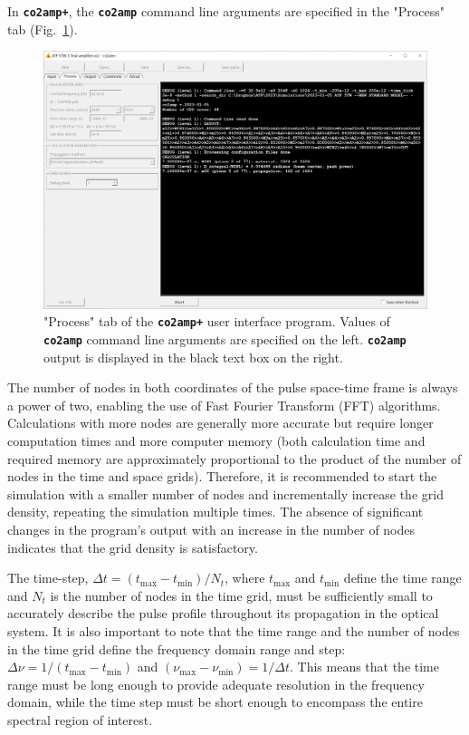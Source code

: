 In \textbf{\texttt{co2amp+}}, the \textbf{\texttt{co2amp}} command line arguments are specified in the "Process" tab (Fig.~\ref{fig:gui-process}).
\begin{figure}[ht]
 \centering
 \includegraphics[width=14cm]{images/gui-process}
 \caption{"Process" tab of the \textbf{\texttt{co2amp+}} user interface program. Values of \textbf{\texttt{co2amp}} command line arguments are specified on the left. \textbf{\texttt{co2amp}} output is displayed in the black text box on the right.}
 \label{fig:gui-process}
\end{figure}
The number of nodes in both coordinates of the pulse space-time frame is always a power of two, enabling the use of Fast Fourier Transform (FFT) algorithms. Calculations with more nodes are generally more accurate but require longer computation times and more computer memory (both calculation time and required memory are approximately proportional to the product of the number of nodes in the time and space grids). Therefore, it is recommended to start the simulation with a smaller number of nodes and incrementally increase the grid density, repeating the simulation multiple times. The absence of significant changes in the program’s output with an increase in the number of nodes indicates that the grid density is satisfactory.

The time-step, \( \Delta t = (t_{\text{max}} - t_{\text{min}}) / N_t \), where \( t_{\text{max}} \) and \( t_{\text{min}} \) define the time range and \( N_t \) is the number of nodes in the time grid, must be sufficiently small to accurately describe the pulse profile throughout its propagation in the optical system. It is also important to note that the time range and the number of nodes in the time grid define the frequency domain range and step: \( \Delta\nu = 1 / (t_{\text{max}} - t_{\text{min}}) \) and \( (\nu_{\text{max}} - \nu_{\text{min}}) = 1 / \Delta t \). This means that the time range must be long enough to provide adequate resolution in the frequency domain, while the time step must be short enough to encompass the entire spectral region of interest.

